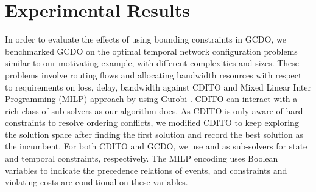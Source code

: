 \documentclass[letterpaper]{article} %
\DeclareMathOperator*{\argmin}{arg\,min}
\theoremstyle{definition}
\newcommand{\LE}{\mathcal{L}}
\begin{document}




\section{Experimental Results}
\label{sec:results}
In order to evaluate the effects of using bounding constraints in GCDO, we benchmarked GCDO on the optimal temporal network configuration problems similar to our motivating example, 
with different complexities and sizes. These problems involve routing flows and allocating bandwidth resources with respect to requirements on loss, delay, bandwidth against CDITO \cite{chen2019efficiently} and Mixed Linear Inter Programming (MILP) approach by using Gurobi \cite{gurobi2020gurobi}. CDITO can interact with a rich class of sub-solvers as our algorithm does. As CDITO is only aware of hard constraints to resolve ordering conflicts, we modified CDITO to keep exploring the solution space after finding the first solution and record the best solution as the incumbent. For both CDITO and GCDO, we use \cite{chen2019efficiently} and \cite{yu2013continuously} as sub-solvers for state and temporal constraints, respectively. The MILP encoding uses Boolean variables to indicate the precedence relations of events, and constraints and violating costs are conditional on these variables.
\end{document}

